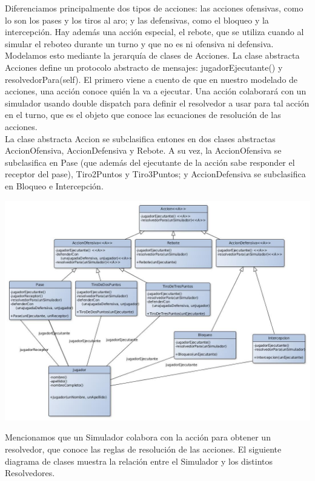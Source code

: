 Diferenciamos principalmente dos tipos de acciones: las acciones ofensivas, como lo son los pases y los tiros al aro; y las defensivas, como el bloqueo y la intercepción.
Hay además una acción especial, el rebote, que se utiliza cuando al simular el reboteo durante un turno y que no es ni ofensiva ni defensiva.\\
Modelamos esto mediante la jerarquía de clases de Acciones. La clase abstracta Acciones define un protocolo abstracto de mensajes: jugadorEjecutante() y resolvedorPara(self). El primero viene a cuento de que en nuestro modelado de acciones, una acción conoce quién la va a ejecutar. Una acción colaborará con un simulador usando double dispatch para definir el resolvedor a usar para tal acción en el turno, que es el objeto que conoce las ecuaciones de resolución de las acciones.\\
La clase abstracta Accion se subclasifica entones en dos clases abstractas AccionOfensiva, AccionDefensiva y Rebote. A su vez, la AccionOfensiva se subclasifica en Pase (que además del ejecutante de la acción sabe responder el receptor del pase), Tiro2Puntos y Tiro3Puntos; y AccionDefensiva se subclasifica en Bloqueo e Intercepción.

\begin{center}
\includegraphics[scale=0.35]{diseno/acciones.jpg}
\end{center}

Mencionamos que un Simulador colabora con la acción para obtener un resolvedor, que conoce las reglas de resolución de las acciones. El siguiente diagrama de clases muestra la relación entre el Simulador y los distintos Resolvedores.


